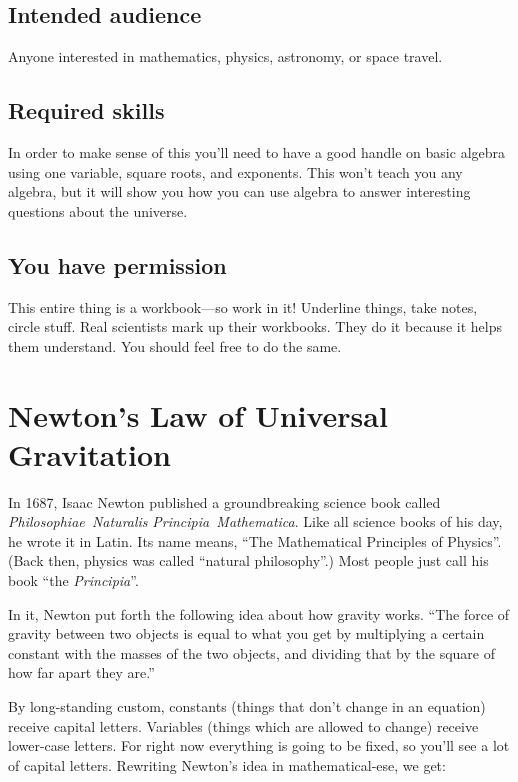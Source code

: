 \documentclass[12pt,letterpaper]{article}
\begin{document}
\subsection{Intended audience}
Anyone interested in mathematics, physics, astronomy, or space
travel.

\subsection{Required skills}
In order to make sense of this you'll need to have a good handle on
basic algebra using one variable, square roots, and exponents.  This
won't teach you any algebra, but it will show you how you can use
algebra to answer interesting questions about the universe.

\subsection{You have permission}
This entire thing is a workbook---so work in it!  Underline things, take
notes, circle stuff.  Real scientists mark up their workbooks.  They
do it because it helps them understand.  You should feel free to do
the same.

\section{Newton's Law of Universal Gravitation}

In 1687, Isaac Newton published a groundbreaking science book called \\
\mbox{\textit{Philosophiae Naturalis}} \mbox{\textit{Principia
    Mathematica}}.  Like all science books of his day, he wrote it in
Latin.  Its name means, ``The Mathematical Principles of
Physics''.  (Back then, physics was called ``natural
  philosophy''.)  Most people just call his book ``the
  \textit{Principia}''.

In it, Newton put forth the following idea about how gravity works.
``The force of gravity between two objects is equal to what
you get by multiplying a certain constant with the masses of the two
objects, and dividing that by the square of how far apart they
are.''

By long-standing custom, constants (things that don't change in an
equation) receive capital letters.  Variables (things which are
allowed to change) receive lower-case letters.  For right now
everything is going to be fixed, so you'll see a lot of capital
letters.  Rewriting Newton's idea in mathematical-ese, we get:
\end{document}

